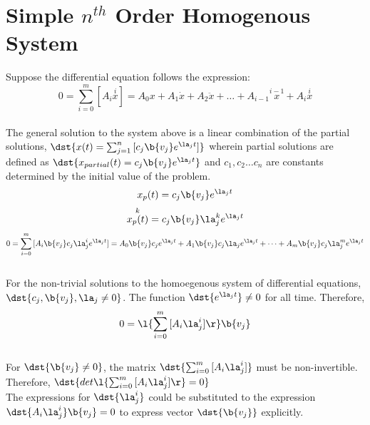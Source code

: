 \section{Simple $n^{th}$ Order Homogenous System}
\begin{comment}
\end{comment}
Suppose the differential equation follows the expression:
$$0 = \sum_{i = 0}^{m}{[A_i \overset{i}{x}]} = A_0 x + A_1 \dot{x} + A_2 \ddot{x}+ \dots + A_{i - 1} \overset{i -  1}{x} + A_{i} \overset{i}{x}$$
\\The general solution to the system above is a linear combination of the partial solutions, $\dst{x(t) = \sum_{j = 1}^{n}{[c_j \b{v_j}e^{\la_j t}]}}$ wherein partial solutions are defined as $\dst{x_{partial}(t) = c_j \b{v_j}e^{\la_j t}}$ and $c_1, c_2 \dots c_n$ are constants determined by the initial value of the problem. 
$$x_{p}(t) = c_j \b{v_j}e^{\la_j t}$$
$$\overset{k}{x_{p}(t)} = c_j \b{v_j}\la_{j}^k e^{\la_j t}$$
$$0 = \sum_{i = 0}^{m}{[A_i \b{v_j} c_j \la_{j}^i e^{\la_j t}]} =A_0 \b{v_j} c_j e^{\la_j t} + A_1 \b{v_j} c_j \la_{j} e^{\la_j t} + \dots + A_m \b{v_j} c_j \la_{j}^m e^{\la_j t}$$
\\For the non-trivial solutions to the homoegenous system of differential equations, $\dst{c_j, \b{v_j}, \la_j \neq 0}$. The function $\dst{e^{\la_j t}}\neq 0$ for all time. Therefore, 
$$0 = \l\{ \sum_{i = 0}^{m}{[A_i \la_{j}^i]} \r\} \b{v_j}$$
\\For $\dst{\b{v_j} \neq 0}$, the matrix $\dst{\sum_{i = 0}^{m}{[A_i \la_{j}^i]}}$ must be non-invertible. Therefore, $\dst{det\l\{ \sum_{i = 0}^{m}{[A_i \la_{j}^i]} \r\} = 0}$
\\The expressions for $\dst{\la_j ^ i}$ could be substituted to the expression $\dst{A_i \la_{j}^i} \b{v_j} = 0$ to express vector $\dst{\b{v_j}}$ explicitly.

